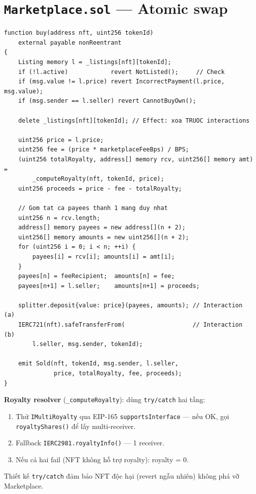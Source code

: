 \documentclass[12pt,a4paper,oneside]{report}
\theoremstyle{plain}
\theoremstyle{definition}
\theoremstyle{remark}
\begin{document}
\section{\texttt{Marketplace.sol} — Atomic swap}

\begin{lstlisting}[language=Solidity,caption={Hàm \texttt{buy()} — trái tim của atomic swap.}]
function buy(address nft, uint256 tokenId)
    external payable nonReentrant
{
    Listing memory l = _listings[nft][tokenId];
    if (!l.active)            revert NotListed();     // Check
    if (msg.value != l.price) revert IncorrectPayment(l.price, msg.value);
    if (msg.sender == l.seller) revert CannotBuyOwn();

    delete _listings[nft][tokenId]; // Effect: xoa TRUOC interactions

    uint256 price = l.price;
    uint256 fee = (price * marketplaceFeeBps) / BPS;
    (uint256 totalRoyalty, address[] memory rcv, uint256[] memory amt) =
        _computeRoyalty(nft, tokenId, price);
    uint256 proceeds = price - fee - totalRoyalty;

    // Gom tat ca payees thanh 1 mang duy nhat
    uint256 n = rcv.length;
    address[] memory payees = new address[](n + 2);
    uint256[] memory amounts = new uint256[](n + 2);
    for (uint256 i = 0; i < n; ++i) {
        payees[i] = rcv[i]; amounts[i] = amt[i];
    }
    payees[n] = feeRecipient;  amounts[n] = fee;
    payees[n+1] = l.seller;    amounts[n+1] = proceeds;

    splitter.deposit{value: price}(payees, amounts); // Interaction (a)
    IERC721(nft).safeTransferFrom(                   // Interaction (b)
        l.seller, msg.sender, tokenId);

    emit Sold(nft, tokenId, msg.sender, l.seller,
              price, totalRoyalty, fee, proceeds);
}
\end{lstlisting}

\textbf{Royalty resolver} (\texttt{\_computeRoyalty}): dùng \texttt{try/catch} hai tầng:
\begin{enumerate}
  \item Thử \texttt{IMultiRoyalty} qua EIP-165 \texttt{supportsInterface} — nếu OK, gọi
        \texttt{royaltyShares()} để lấy multi-receiver.
  \item Fallback \texttt{IERC2981.royaltyInfo()} — 1 receiver.
  \item Nếu cả hai fail (NFT không hỗ trợ royalty): royalty = 0.
\end{enumerate}
Thiết kế \texttt{try/catch} đảm bảo NFT độc hại (revert ngẫu nhiên) không phá vỡ Marketplace.
\end{document}
